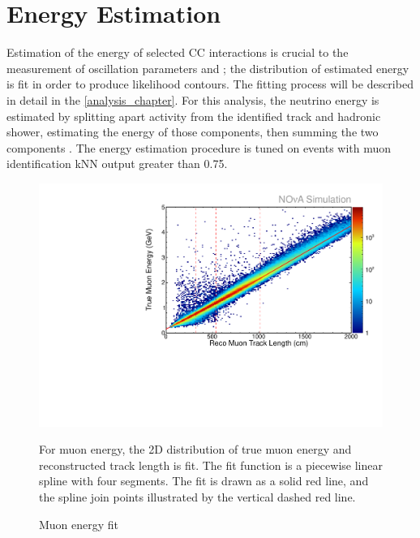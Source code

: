 \section{Energy Estimation}
\label{energy_section}

Estimation of the energy of selected \numu CC interactions is crucial to
the measurement of oscillation parameters \thetatth and \deltamtht; the
distribution of estimated energy is fit in order to
produce likelihood contours.
The fitting process will be described in detail in the \ref{analysis_chapter}.
For this analysis, the neutrino energy is estimated by splitting
apart activity from the identified track and hadronic shower, estimating
the energy of those components, then summing the two components
\cite{lein2015thesis}.
The energy estimation procedure is tuned on events with muon identification
kNN output greater than 0.75.

\begin{figure}
  \includegraphics[width=\textwidth]{figures/plots/reco/numu_energy_muon_fit.pdf}
  \caption{Muon energy fit}{For muon energy, the
  2D distribution of true muon energy and reconstructed track length is fit.
  The fit function is a piecewise
  linear spline with four segments.  The fit is drawn as a solid red line,
  and the spline join points illustrated by the vertical dashed red line.}
  \label{muon_energy_fit}
\end{figure}

